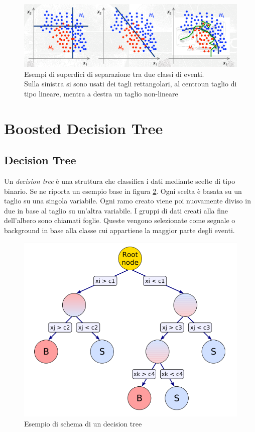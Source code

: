     \begin{figure}[htbp]
        \centering
        \includegraphics[width=0.8\linewidth]{TMVA/problemiSelezione.png}
        \caption{ Esempi di superdici di separazione tra due classi di eventi.
        \\ Sulla sinistra si sono usati dei tagli rettangolari, al centroun taglio di tipo lineare, mentra a destra un taglio non-lineare }
        \label{fig:esempiCut}
    \end{figure}
    
\section{Boosted Decision Tree} \label{BDT}

    \subsection{Decision Tree}
    Un \textit{decision tree} è una struttura che classifica i dati mediante scelte di tipo binario. Se ne riporta un esempio base in figura \ref{fig:BDT}. Ogni scelta è basata su un taglio su una singola variabile.%
    Ogni ramo creato viene poi nuovamente diviso in due in base al taglio su un'altra variabile. I gruppi di dati creati alla fine dell'albero sono chiamati foglie. Queste vengono selezionate come segnale o background in base alla classe cui appartiene la maggior parte degli eventi. 
    
    \begin{figure}[htbp]
        \centering
        \includegraphics[width=0.5\linewidth]{TMVA/BDT1.PNG}
        \caption{ Esempio di schema di un decision tree}
        \label{fig:BDT}
    \end{figure}
    
